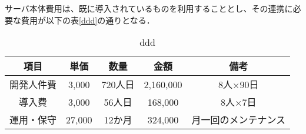 サーバ本体費用は、既に導入されているものを利用することとし、その連携に必要な費用が以下の表\ref{ddd}の通りとなる．
\begin{table}[htb]
  \caption{ddd}
  \begin{tabular}{|c|c|c||c|c|} \hline
    項目 & 単価 & 数量 & 金額 & 備考\\ \hline \hline
    開発人件費 & 3,000 & 720人日& 2,160,000 & 8人×90日\\ \hline 
    導入費 & 3,000 & 56人日& 168,000 & 8人×7日\\ \hline
    運用・保守 & 27,000 & 12か月 & 324,000 & 月一回のメンテナンス\\ \hline 
  \end{tabular}
\end{table}




